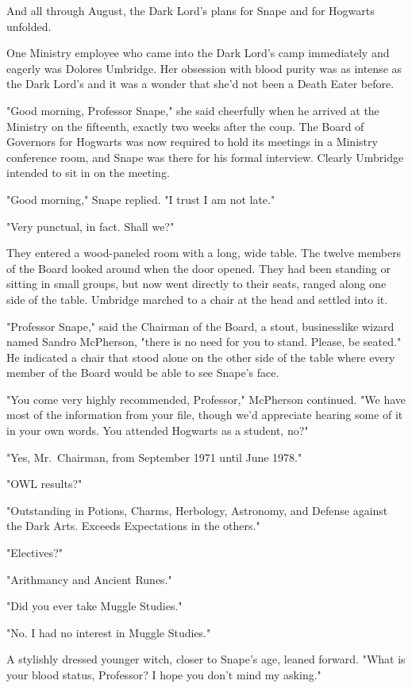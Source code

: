 And all through August, the Dark Lord's plans for Snape and for Hogwarts unfolded.

One Ministry employee who came into the Dark Lord's camp immediately and eagerly was Dolores Umbridge. Her obsession with blood purity was as intense as the Dark Lord's and it was a wonder that she'd not been a Death Eater before.

"Good morning, Professor Snape," she said cheerfully when he arrived at the Ministry on the fifteenth, exactly two weeks after the coup. The Board of Governors for Hogwarts was now required to hold its meetings in a Ministry conference room, and Snape was there for his formal interview. Clearly Umbridge intended to sit in on the meeting.

"Good morning," Snape replied. "I trust I am not late."

"Very punctual, in fact. Shall we?"

They entered a wood-paneled room with a long, wide table. The twelve members of the Board looked around when the door opened. They had been standing or sitting in small groups, but now went directly to their seats, ranged along one side of the table. Umbridge marched to a chair at the head and settled into it.

"Professor Snape," said the Chairman of the Board, a stout, businesslike wizard named Sandro McPherson, "there is no need for you to stand. Please, be seated." He indicated a chair that stood alone on the other side of the table where every member of the Board would be able to see Snape's face.

"You come very highly recommended, Professor," McPherson continued. "We have most of the information from your file, though we'd appreciate hearing some of it in your own words. You attended Hogwarts as a student, no?"

"Yes, Mr.~Chairman, from September 1971 until June 1978."

"OWL results?"

"Outstanding in Potions, Charms, Herbology, Astronomy, and Defense against the Dark Arts. Exceeds Expectations in the others."

"Electives?"

"Arithmancy and Ancient Runes."

"Did you ever take Muggle Studies."

"No. I had no interest in Muggle Studies."

A stylishly dressed younger witch, closer to Snape's age, leaned forward. "What is your blood status, Professor? I hope you don't mind my asking."

